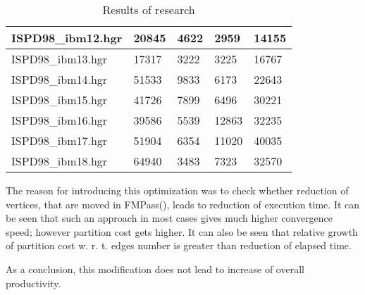\documentclass[12pt,a4paper,twocolumn]{article}
\begin{document}
\begin{table}[]
\begin{tabular}{|l|ll|ll|}
			ISPD98\_ibm12.hgr & \multicolumn{1}{l|}{20845}        & 4622           & \multicolumn{1}{l|}{2959}         & 14155          \\ \hline
			ISPD98\_ibm13.hgr & \multicolumn{1}{l|}{17317}        & 3222           & \multicolumn{1}{l|}{3225}         & 16767          \\ \hline
			ISPD98\_ibm14.hgr & \multicolumn{1}{l|}{51533}        & 9833           & \multicolumn{1}{l|}{6173}         & 22643          \\ \hline
			ISPD98\_ibm15.hgr & \multicolumn{1}{l|}{41726}        & 7899           & \multicolumn{1}{l|}{6496}         & 30221          \\ \hline
			ISPD98\_ibm16.hgr & \multicolumn{1}{l|}{39586}        & 5539           & \multicolumn{1}{l|}{12863}        & 32235          \\ \hline
			ISPD98\_ibm17.hgr & \multicolumn{1}{l|}{51904}        & 6354           & \multicolumn{1}{l|}{11020}        & 40035          \\ \hline
			ISPD98\_ibm18.hgr & \multicolumn{1}{l|}{64940}        & 3483           & \multicolumn{1}{l|}{7323}         & 32570          \\ \hline
		\end{tabular}
		\caption{Results of research}
		\label{tab:res}
		\twocolumn
	\end{table}

	The reason for introducing this optimization was to check whether reduction of vertices, that are moved in FMPass(), leads to reduction of execution time. It can be seen that such an approach in most cases gives much higher convergence speed; however partition cost gets higher. It can also be seen that relative growth of partition cost w. r. t. edges number is greater than reduction of elapsed time.
	
	As a conclusion, this modification does not lead to increase of overall productivity.
	
\end{document}
